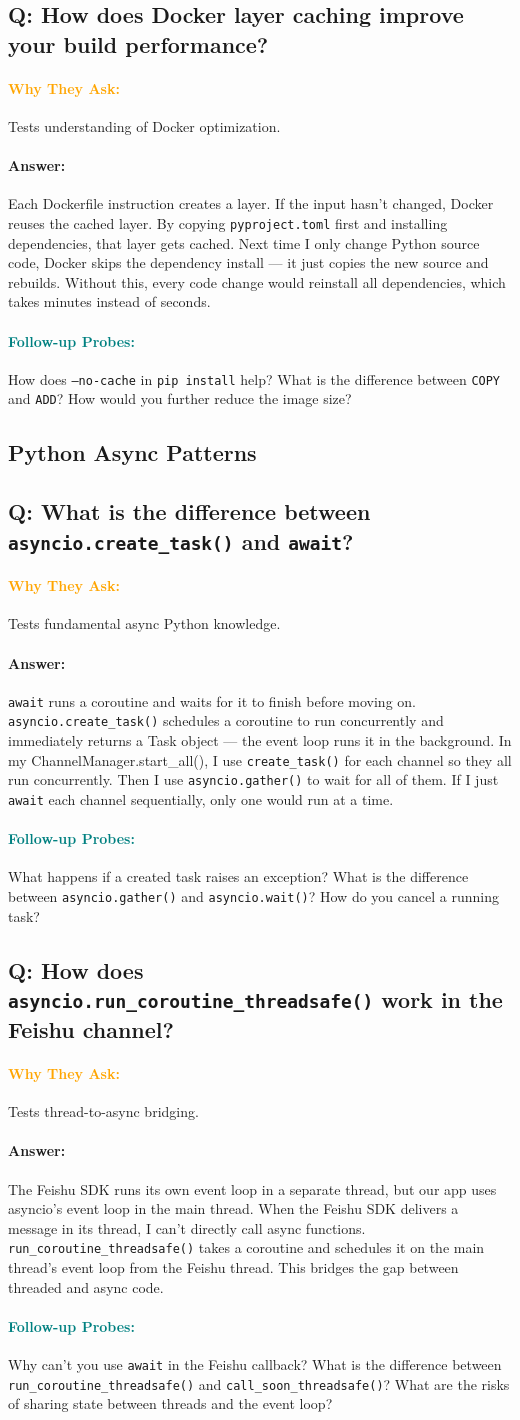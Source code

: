 \documentclass[11pt,a4paper]{article}
\newcommand{\Q}[1]{\subsection{#1}}
\newcommand{\Ans}[1]{\paragraph{\textbf{Answer:}} #1}
\newcommand{\Why}{\paragraph{\textcolor{orange}{\textbf{Why They Ask:}}}}
\newcommand{\Probe}{\paragraph{\textcolor{teal}{\textbf{Follow-up Probes:}}}}
\begin{document}
\Q{Q: How does Docker layer caching improve your build performance?}
\Why Tests understanding of Docker optimization.
\Ans Each Dockerfile instruction creates a layer. If the input hasn't changed, Docker reuses the cached layer. By copying \texttt{pyproject.toml} first and installing dependencies, that layer gets cached. Next time I only change Python source code, Docker skips the dependency install --- it just copies the new source and rebuilds. Without this, every code change would reinstall all dependencies, which takes minutes instead of seconds.
\Probe How does \texttt{--no-cache} in \texttt{pip install} help? What is the difference between \texttt{COPY} and \texttt{ADD}? How would you further reduce the image size?

\subsection{Python Async Patterns}

\Q{Q: What is the difference between \texttt{asyncio.create\_task()} and \texttt{await}?}
\Why Tests fundamental async Python knowledge.
\Ans \texttt{await} runs a coroutine and waits for it to finish before moving on. \texttt{asyncio.create\_task()} schedules a coroutine to run concurrently and immediately returns a Task object --- the event loop runs it in the background. In my ChannelManager.start\_all(), I use \texttt{create\_task()} for each channel so they all run concurrently. Then I use \texttt{asyncio.gather()} to wait for all of them. If I just \texttt{await} each channel sequentially, only one would run at a time.
\Probe What happens if a created task raises an exception? What is the difference between \texttt{asyncio.gather()} and \texttt{asyncio.wait()}? How do you cancel a running task?

\Q{Q: How does \texttt{asyncio.run\_coroutine\_threadsafe()} work in the Feishu channel?}
\Why Tests thread-to-async bridging.
\Ans The Feishu SDK runs its own event loop in a separate thread, but our app uses asyncio's event loop in the main thread. When the Feishu SDK delivers a message in its thread, I can't directly call async functions. \texttt{run\_coroutine\_threadsafe()} takes a coroutine and schedules it on the main thread's event loop from the Feishu thread. This bridges the gap between threaded and async code.
\Probe Why can't you use \texttt{await} in the Feishu callback? What is the difference between \texttt{run\_coroutine\_threadsafe()} and \texttt{call\_soon\_threadsafe()}? What are the risks of sharing state between threads and the event loop?
\end{document}
